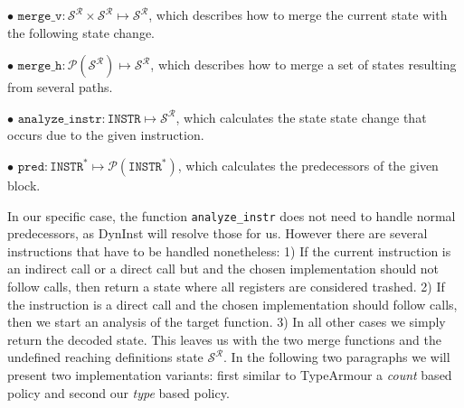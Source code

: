 $\bullet$ $\texttt{merge\_v} : \mathcal{S}^\mathcal{R} \times \mathcal{S}^\mathcal{R} \mapsto \mathcal{S}^\mathcal{R}$, which describes how to merge the current state with the following state change.

$\bullet$ $\texttt{merge\_h} : \mathcal{P}(\mathcal{S}^\mathcal{R}) \mapsto \mathcal{S}^\mathcal{R}$, which describes how to merge a set of states resulting from several paths.

$\bullet$ $\texttt{analyze\_instr} : \texttt{INSTR} \mapsto \mathcal{S}^\mathcal{R}$, which calculates the state state change that occurs due to the given instruction.

$\bullet$ $\texttt{pred} : \texttt{INSTR}^* \mapsto \mathcal{P}(\texttt{INSTR}^*)$, which calculates the predecessors of the given block.

In our specific case, the function \texttt{analyze\_instr} does not need to handle normal predecessors, as DynInst will resolve those for us. 
However there are several instructions that have to be handled nonetheless: 1) If the current instruction is an indirect call or a direct call 
but and the chosen implementation should not follow calls, then return a state where all registers are considered trashed. 2) If the instruction 
is a direct call and the chosen implementation should follow calls, then we start an analysis of the target function. 3) In all other cases we 
simply return the decoded state. This leaves us with the two merge functions and the undefined reaching definitions state $\mathcal{S}^\mathcal{R}$. 
In the following two paragraphs we will present two implementation variants: first similar to TypeArmour a \emph{count} based policy and second our 
\emph{type} based policy. 




